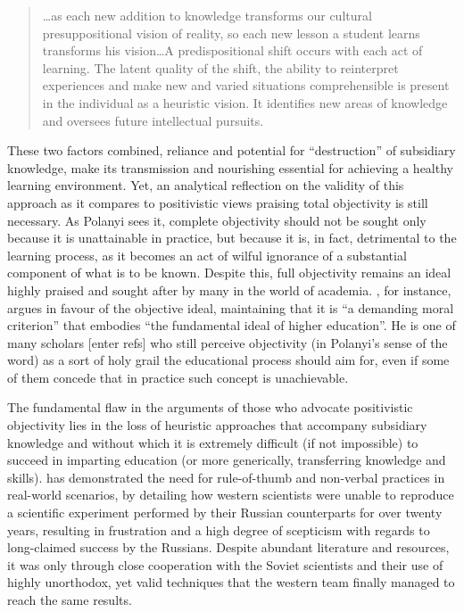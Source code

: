 \begin{quote}
\ldots as each new addition to knowledge transforms our cultural presuppositional vision of reality, so each new lesson a student learns transforms his vision\ldots A predispositional shift occurs with each act of learning. The latent quality of the shift, the ability to reinterpret experiences and make new and varied situations comprehensible is present in the individual as a heuristic vision. It identifies new areas of knowledge and oversees future intellectual pursuits.
\end{quote}

These two factors combined, reliance and potential for ``destruction'' of subsidiary knowledge, make its transmission and nourishing essential for achieving a healthy learning environment. Yet, an analytical reflection on the validity of this approach as it compares to positivistic views praising total objectivity is still necessary. As Polanyi sees it, complete objectivity should not be sought only because it is unattainable in practice, but because it is, in fact, detrimental to the learning process, as it becomes an act of wilful ignorance of a substantial component of what is to be known. Despite this, full objectivity remains an ideal highly praised and sought after by many in the world of academia. \citet{lavoie95}, for instance, argues in favour of the objective ideal, maintaining that it is ``a demanding moral criterion'' that embodies ``the fundamental ideal of higher education''. He is one of many scholars [enter refs] who still perceive objectivity (in Polanyi's sense of the word) as a sort of holy grail the educational process should aim for, even if some of them concede that in practice such concept is unachievable.

The fundamental flaw in the arguments of those who advocate positivistic objectivity lies in the loss of heuristic approaches that accompany subsidiary knowledge and without which it is extremely difficult (if not impossible) to succeed in imparting education (or more generically, transferring knowledge and skills). \citet{collins01} has demonstrated the need for rule-of-thumb and non-verbal practices in real-world scenarios, by detailing how western scientists were unable to reproduce a scientific experiment performed by their Russian counterparts for over twenty years, resulting in frustration and a high degree of scepticism with regards to long-claimed success by the Russians. Despite abundant literature and resources, it was only through close cooperation with the Soviet scientists and their use of highly unorthodox, yet valid techniques that the western team finally managed to reach the same results.

